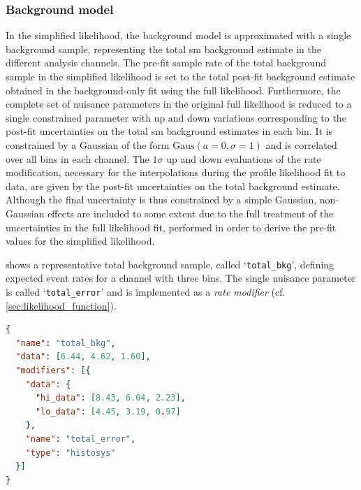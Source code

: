 \subsubsection{Background model}

In the simplified likelihood, the background model is approximated with a single background sample, representing the total \gls{sm} background estimate in the different analysis channels.
The pre-fit sample rate of the total background sample in the simplified likelihood is set to the total post-fit background estimate obtained in the background-only fit using the full likelihood.
Furthermore, the complete set of nuisance parameters in the original full likelihood is reduced to a single constrained parameter with up and down variations corresponding to the post-fit uncertainties on the total \gls{sm} background estimates in each bin.
It is constrained by a Gaussian of the form $\mathrm{Gaus}(a = 0, \sigma = 1)$ and is correlated over all bins in each channel. The $1\sigma$ up and down evaluations of the rate modification, necessary for the interpolations during the profile likelihood fit to data, are given by the post-fit uncertainties on the total background estimate.
Although the final uncertainty is thus constrained by a simple Gaussian, non-Gaussian effects are included to some extent due to the full treatment of the uncertainties in the full likelihood fit, performed in order to derive the pre-fit values for the simplified likelihood.

 shows a representative total background sample, called `\texttt{total\_bkg}', defining expected event rates for a channel with three bins. The single nuisance parameter is called `\texttt{total\_error}' and is implemented as a \textit{rate modifier} (cf. \cref{sec:likelihood_function}).

\begin{minipage}{\linewidth}
\begin{lstlisting}[language=json,firstnumber=1,caption={Representative total background sample with sample rate and total uncertainty for three separate bins, derived from a fit in the \glspl{sr} and \glspl{cr} using the full likelihood. The \texttt{histosys} type modifier in \lib{HistFactory} implements a shape uncertainty correlated over all bins.},captionpos=b, label=lst:bkg_sample]
{
  "name": "total_bkg",
  "data": [6.44, 4.62, 1.60],
  "modifiers": [{
    "data": {
      "hi_data": [8.43, 6.04, 2.23], 
      "lo_data": [4.45, 3.19, 0.97]
    }, 
    "name": "total_error",
    "type": "histosys"
  }]
}
\end{lstlisting}
\end{minipage}

